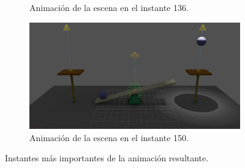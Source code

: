 \begin{figure}[H]
\begin{subfigure}[t]{0.48\textwidth}
    \caption{Animación de la escena en el instante 136.}
 \end{subfigure}
\hfill
 \begin{subfigure}[t]{0.48\textwidth}
    \centering
    \includegraphics[width=\textwidth]{imagenes/animaciones/general/150.jpg}
    \caption{Animación de la escena en el instante 150.}
 \end{subfigure}
 \caption{Instantes más importantes de la animación resultante.}
\end{figure}